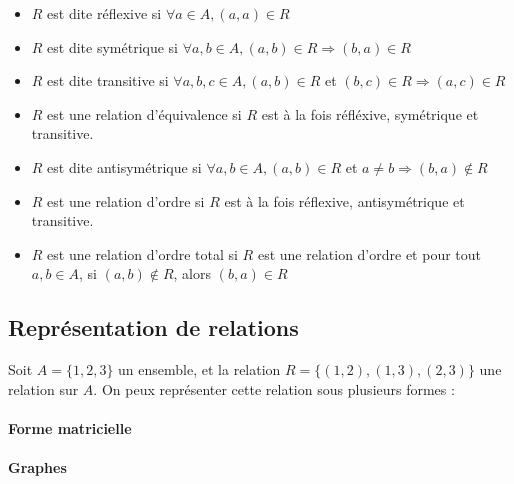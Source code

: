 \documentclass[12pt, a4paper]{report}
\begin{document}
\begin{itemize}
\item $R$ est dite réflexive si $\forall a\in A, (a,a)\in R$

\item $R$ est dite symétrique si $\forall a, b\in A, (a,b)\in R
  \Rightarrow (b,a)\in R$

\item $R$ est dite transitive si $\forall a, b, c\in A, (a,b)\in R$ et
  $(b,c)\in R \Rightarrow (a,c)\in R$

\item $R$ est une relation d'équivalence si $R$ est à la fois
  réfléxive, symétrique et transitive.

\item $R$ est dite antisymétrique si $\forall a, b\in A, (a,b)\in R$
  et $a\neq b \Rightarrow (b,a)\not\in R$
\item $R$ est une relation d'ordre si $R$ est à la fois réflexive, antisymétrique et transitive.
\item $R$ est une relation d'ordre total si $R$ est une relation d'ordre et pour tout $a, b\in A$, si $(a,b) \not\in R$, alors $(b,a)\in R$
\end{itemize}

\subsection{Représentation de relations}

Soit $A = \{1,2,3\}$ un ensemble, et la relation $R = \{(1,2),(1,3),(2,3)\}$ une relation sur $A$. On peux représenter cette relation sous plusieurs formes :

\paragraph{Forme matricielle}

\paragraph{Graphes}
 
\end{document}
